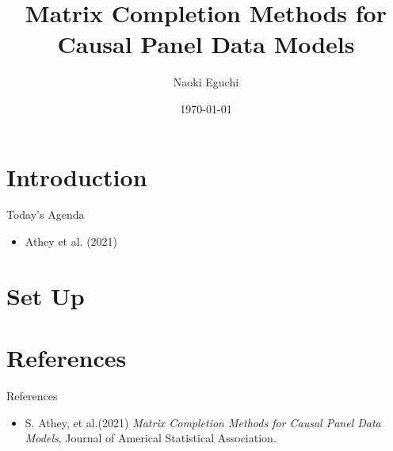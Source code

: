 \documentclass[xcolor=svgnames,aspectratio=169]{beamer}
\begin{document}
 

\title{Matrix Completion Methods for Causal Panel Data Models}
\author{Naoki Eguchi}          
\date{\today}

\begin{frame}                  
    \titlepage                     
\end{frame}

\section{Introduction}

\begin{frame}{Today's Agenda}
    \begin{itemize}
        \item Athey et al. (2021)
    \end{itemize}
\end{frame}

\section{Set Up}



\section{References}

\begin{frame}{References}
    \begin{itemize}
        \item S. Athey, et al.(2021) \textit{Matrix Completion Methods for Causal Panel
        Data Models}, Journal of Americal Statistical Association.
    \end{itemize}
\end{frame}
\end{document}
